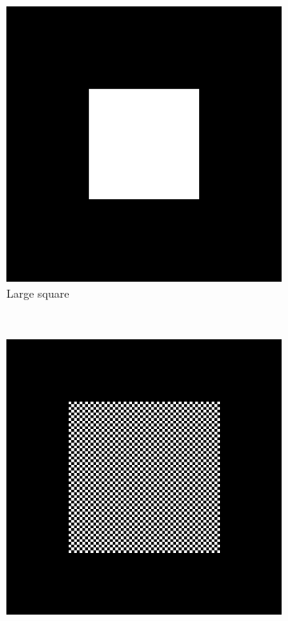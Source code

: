 \documentclass[journal]{IEEEtran}
\begin{document}
\begin{figure} [ht]
	\begin{center}
		\begin{subfigure}{0.2\textwidth}
			\includegraphics[scale=0.2]{square}
			\caption{Large square}
			\label{subfig:a}
		\end{subfigure}		
		~
		\begin{subfigure}{0.2\textwidth}
			\includegraphics[scale=0.2]{checker_fine_large}

\end{subfigure}
\end{center}
\end{figure}
\end{document}
